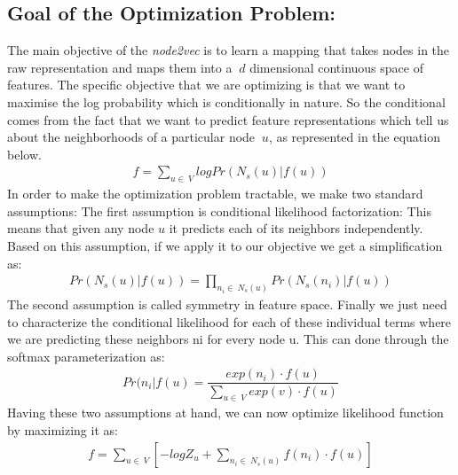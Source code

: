 \documentclass[a4paper,13pt]{article}
\begin{document}
\subsection{Goal of the Optimization Problem:}
The main objective of the \textit{node2vec} is to learn a mapping that takes nodes in the raw representation and maps them into a $\ d $ dimensional continuous space of features. The specific objective that we are optimizing is that we want to maximise the log probability which is conditionally in nature. So the conditional comes from the fact that we want to predict feature representations which tell us about the neighborhoods of a particular node $\ u $, as represented in the equation below.
\begin{equation*}
\begin{aligned}
f = \sum_{u \in\ V}{logPr(N_s(u)|f(u))}
\end{aligned}
\end{equation*}
In order to make the optimization problem tractable, we make two standard assumptions: The first assumption is conditional likelihood factorization: This means that given any node $u$ it predicts each of its neighbors independently. Based on this assumption, if we apply it to our objective we get a simplification as: 
\begin{equation*}
\begin{aligned}
{Pr(N_s(u)|f(u))} = \prod_{n_i\in\ N_s(u)}{Pr(N_s(n_i)|f(u))}
\end{aligned}
\end{equation*}
The second assumption is called symmetry in feature space. Finally we just need to characterize the conditional likelihood for each of these individual terms where we are predicting these neighbors ni for every node u. This can done through the softmax parameterization as:
\begin{equation*}
\begin{aligned}
{Pr(n_i|f(u)} = \dfrac{exp(n_i)\cdot f(u)}{\sum_{u \in\ V}{exp(v)\cdot f(u)}}
\end{aligned}
\end{equation*}
Having these two assumptions at hand, we can now optimize likelihood function by maximizing it as:
\begin{equation*}
\begin{aligned}
f = \sum_{u \in\ V}[{-logZ_u } +  \sum_{n_i\in\ N_s(u)}{f(n_i)\cdot f(u)}]
\end{aligned}
\end{equation*}
\end{document}
